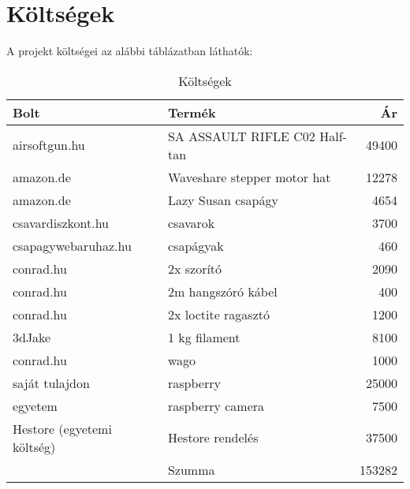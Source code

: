 \chapter{Költségek}
A projekt költségei az alábbi táblázatban láthatók:
\begin{table}[h!]
	\centering
	\begin{tabular}{|l|l|r|}
		\hline
		\textbf{Bolt}              & \textbf{Termék}               & \textbf{Ár} \\ \hline
		airsoftgun.hu              & SA ASSAULT RIFLE C02 Half-tan & 49400       \\ \hline
		amazon.de                  & Waveshare stepper motor hat   & 12278       \\ \hline
		amazon.de                  & Lazy Susan csapágy            & 4654        \\ \hline
		csavardiszkont.hu          & csavarok                      & 3700        \\ \hline
		csapagywebaruhaz.hu        & csapágyak                     & 460         \\ \hline
		conrad.hu                  & 2x szorító                    & 2090        \\ \hline
		conrad.hu                  & 2m hangszóró kábel            & 400         \\ \hline
		conrad.hu                  & 2x loctite ragasztó           & 1200        \\ \hline
		3dJake                     & 1 kg filament                 & 8100        \\ \hline
		conrad.hu                  & wago                          & 1000        \\ \hline
		saját tulajdon             & raspberry                     & 25000       \\ \hline
		egyetem                    & raspberry camera              & 7500        \\ \hline
		Hestore (egyetemi költség) & Hestore rendelés              & 37500       \\ \hline
		& Szumma                        & 153282      \\ \hline
	\end{tabular}
	\caption{Költségek}
	\label{tab:koltsegek}
\end{table}